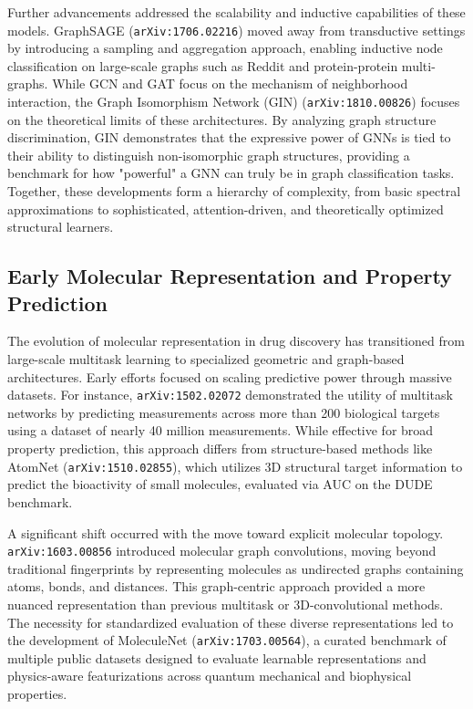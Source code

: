 \documentclass[11pt]{article}
\begin{document}
Further advancements addressed the scalability and inductive capabilities of these models. GraphSAGE (\texttt{arXiv:1706.02216}) moved away from transductive settings by introducing a sampling and aggregation approach, enabling inductive node classification on large-scale graphs such as Reddit and protein-protein multi-graphs. While GCN and GAT focus on the mechanism of neighborhood interaction, the Graph Isomorphism Network (GIN) (\texttt{arXiv:1810.00826}) focuses on the theoretical limits of these architectures. By analyzing graph structure discrimination, GIN demonstrates that the expressive power of GNNs is tied to their ability to distinguish non-isomorphic graph structures, providing a benchmark for how "powerful" a GNN can truly be in graph classification tasks. Together, these developments form a hierarchy of complexity, from basic spectral approximations to sophisticated, attention-driven, and theoretically optimized structural learners.

\subsection{Early Molecular Representation and Property Prediction}

The evolution of molecular representation in drug discovery has transitioned from large-scale multitask learning to specialized geometric and graph-based architectures. Early efforts focused on scaling predictive power through massive datasets. For instance, \texttt{arXiv:1502.02072} demonstrated the utility of multitask networks by predicting measurements across more than 200 biological targets using a dataset of nearly 40 million measurements. While effective for broad property prediction, this approach differs from structure-based methods like AtomNet (\texttt{arXiv:1510.02855}), which utilizes 3D structural target information to predict the bioactivity of small molecules, evaluated via AUC on the DUDE benchmark.

A significant shift occurred with the move toward explicit molecular topology. \texttt{arXiv:1603.00856} introduced molecular graph convolutions, moving beyond traditional fingerprints by representing molecules as undirected graphs containing atoms, bonds, and distances. This graph-centric approach provided a more nuanced representation than previous multitask or 3D-convolutional methods. The necessity for standardized evaluation of these diverse representations led to the development of MoleculeNet (\texttt{arXiv:1703.00564}), a curated benchmark of multiple public datasets designed to evaluate learnable representations and physics-aware featurizations across quantum mechanical and biophysical properties.
\end{document}
